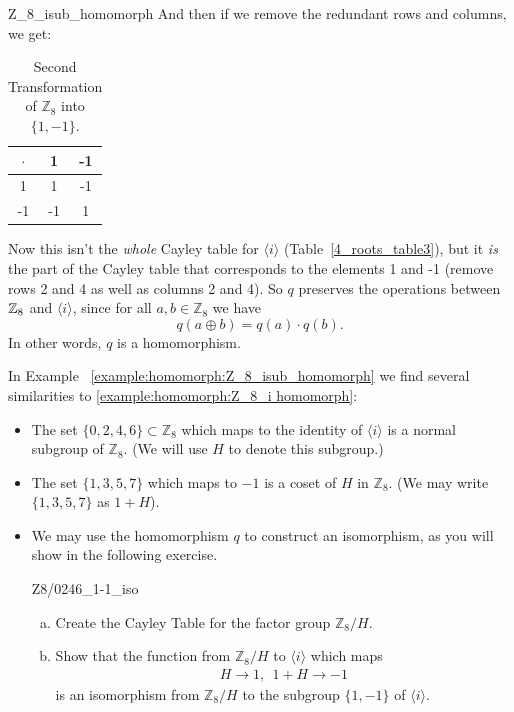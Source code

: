 \begin{example}{Z_8_isub_homomorph}
And then if we remove the redundant rows and columns, we get:

\begin{table}[H]
\caption{\label{1,-1_Z8_transfom2}Second Transformation of ${\mathbb Z}_8$ into $\{1,-1\}$.}{\small
\begin{center}
\begin{tabular}{c|cc}
$\cdot$ & 1 & -1  \\
\hline
1        & 1 & -1  \\
-1       & -1 & 1 \\
\end{tabular}
\end{center}
}
\end{table}

Now this isn't the \emph{whole} Cayley table for $\langle i \rangle$ (Table~\ref{4_roots_table3}), but it \emph{is} the part of the Cayley table that corresponds to the elements 1 and -1 (remove rows 2 and 4 as well as columns 2 and 4).  So $q$  preserves the operations between $\mathbb{Z}_8$ and $\langle i \rangle$, since for all $a,b \in {\mathbb Z}_8$ we have
\[
q(a \oplus b) = q(a) \cdot q(b).
\]
In other words, $q$ is a homomorphism.
\end{example}

In Example ~\ref{example:homomorph:Z_8_isub_homomorph} we find several similarities to \ref{example:homomorph:Z_8_i homomorph}:

\begin{itemize}
\item
The set $\{0,2,4,6\} \subset {\mathbb Z}_8$ which maps to  the identity of $\langle i \rangle$ is a  normal subgroup of  ${\mathbb Z}_8$. (We will use $H$ to denote this subgroup.)
\item
The set $\{1,3,5,7\}$ which maps to $-1$  is a coset of $H$ in ${\mathbb Z}_8$. (We may write $\{1,3,5,7\}$ as $1+H$).

\item
We may use the homomorphism $q$ to construct an isomorphism, as you will show in the following exercise.

\begin{exercise}{Z8/0246_1-1_iso}
\begin{enumerate}[(a)]
\item
Create the Cayley Table for the factor group ${\mathbb Z}_8/ H$.
\item
Show that the function from ${\mathbb Z}_8/ H$  to $\langle i \rangle$  which maps
\begin{align*}
   H \longrightarrow 1 ,~~     1+H \longrightarrow -1
\end{align*}
is an isomorphism from ${\mathbb Z}_8/ H$ to the subgroup $\{1,-1\}$ of $ \langle i \rangle$.
\end{enumerate}
\end{exercise}

\end{itemize}


